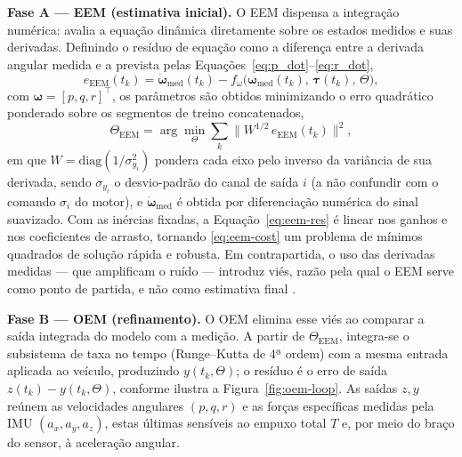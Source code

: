 \textbf{Fase A --- EEM (estimativa inicial).} O EEM dispensa a integração numérica: avalia a equação dinâmica diretamente sobre os estados medidos e suas derivadas. Definindo o resíduo de equação como a diferença entre a derivada angular medida e a prevista pelas Equações~\eqref{eq:p_dot}--\eqref{eq:r_dot},
\begin{equation}
e_{\text{EEM}}(t_k) = \dot{\boldsymbol{\omega}}_{\text{med}}(t_k) - f_\omega\big(\boldsymbol{\omega}_{\text{med}}(t_k),\, \boldsymbol{\tau}(t_k),\, \Theta\big),
\label{eq:eem-res}
\end{equation}
com $\boldsymbol{\omega} = [p,q,r]^\top$, os parâmetros são obtidos minimizando o erro quadrático ponderado sobre os segmentos de treino concatenados,
\begin{equation}
\Theta_{\text{EEM}} = \arg\min_{\Theta} \sum_{k} \big\| W^{1/2}\, e_{\text{EEM}}(t_k) \big\|^2,
\label{eq:eem-cost}
\end{equation}
em que $W = \mathrm{diag}(1/\sigma_{y_i}^2)$ pondera cada eixo pelo inverso da variância de sua derivada, sendo $\sigma_{y_i}$ o desvio-padrão do canal de saída $i$ (a não confundir com o comando $\sigma_i$ do motor), e $\dot{\boldsymbol{\omega}}_{\text{med}}$ é obtida por diferenciação numérica do sinal suavizado. Com as inércias fixadas, a Equação~\eqref{eq:eem-res} é linear nos ganhos e nos coeficientes de arrasto, tornando \eqref{eq:eem-cost} um problema de mínimos quadrados de solução rápida e robusta. Em contrapartida, o uso das derivadas medidas --- que amplificam o ruído --- introduz viés, razão pela qual o EEM serve como ponto de partida, e não como estimativa final \cite{Jategaonkar2015}.

\textbf{Fase B --- OEM (refinamento).} O OEM elimina esse viés ao comparar a saída integrada do modelo com a medição. A partir de $\Theta_{\text{EEM}}$, integra-se o subsistema de taxa no tempo (Runge--Kutta de 4ª ordem) com a mesma entrada aplicada ao veículo, produzindo $y(t_k,\Theta)$; o resíduo é o erro de saída $z(t_k) - y(t_k,\Theta)$, conforme ilustra a Figura~\ref{fig:oem-loop}. As saídas $z,y$ reúnem as velocidades angulares $(p,q,r)$ e as forças específicas medidas pela IMU $(a_x,a_y,a_z)$, estas últimas sensíveis ao empuxo total $T$ e, por meio do braço do sensor, à aceleração angular.

